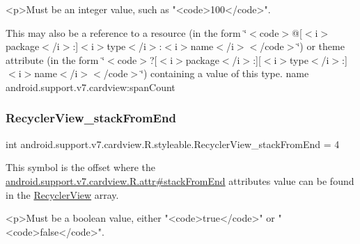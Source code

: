 \begin{DoxyVerb}      <p>Must be an integer value, such as "<code>100</code>".
\end{DoxyVerb}
 

This may also be a reference to a resource (in the form \char`\"{}$<$code$>$@\mbox{[}$<$i$>$package$<$/i$>$\+:\mbox{]}$<$i$>$type$<$/i$>$\+:$<$i$>$name$<$/i$>$$<$/code$>$\char`\"{}) or theme attribute (in the form \char`\"{}$<$code$>$?\mbox{[}$<$i$>$package$<$/i$>$\+:\mbox{]}\mbox{[}$<$i$>$type$<$/i$>$\+:\mbox{]}$<$i$>$name$<$/i$>$$<$/code$>$\char`\"{}) containing a value of this type.  name android.\+support.\+v7.\+cardview\+:span\+Count \mbox{\label{classandroid_1_1support_1_1v7_1_1cardview_1_1R_1_1styleable_af94123221870052541c69f6f043aa704}} 
\subsubsection{\texorpdfstring{Recycler\+View\+\_\+stack\+From\+End}{RecyclerView\_stackFromEnd}}
{\footnotesize\ttfamily int android.\+support.\+v7.\+cardview.\+R.\+styleable.\+Recycler\+View\+\_\+stack\+From\+End = 4\hspace{0.3cm}{\ttfamily [static]}}

This symbol is the offset where the \hyperlink{classandroid_1_1support_1_1v7_1_1cardview_1_1R_1_1attr_a13a8615ddb6987faae277ec447427c83}{android.\+support.\+v7.\+cardview.\+R.\+attr\#stack\+From\+End} attribute\textquotesingle{}s value can be found in the \hyperlink{classandroid_1_1support_1_1v7_1_1cardview_1_1R_1_1styleable_a65f321ce206d51d7c6ea76d7ea7bbb05}{Recycler\+View} array.

\begin{DoxyVerb}      <p>Must be a boolean value, either "<code>true</code>" or "<code>false</code>".
\end{DoxyVerb}
 

